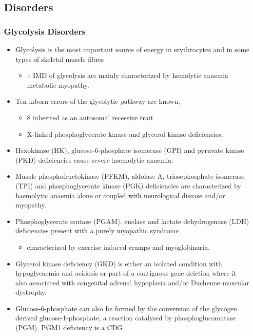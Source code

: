 \documentclass{scrartcl}
\begin{document}
\subsection{Disorders}
\label{sec:orga656f18}
\subsubsection{Glycolysis Disorders}
\label{sec:org9103292}
\begin{itemize}
\item Glycolysis is the most important source of energy in erythrocytes
and in some types of skeletal muscle fibres

\begin{itemize}
\item \(\therefore\) IMD of glycolysis are mainly characterized by hemolytic
anaemia \textpm{} metabolic myopathy.
\end{itemize}

\item Ten inborn errors of the glycolytic pathway are known,
\begin{itemize}
\item 8 inherited as an autosomal recessive trait
\item X-linked phosphoglycerate kinase and glycerol kinase deficiencies.
\end{itemize}

\item Hexokinase (HK), glucose-6-phosphate isomerase (GPI) and pyruvate
kinase (PKD) deficiencies cause severe haemolytic anaemia.

\item Muscle phosphofructokinase (PFKM), aldolase A, triosephosphate
isomerase (TPI) and phosphoglycerate kinase (PGK) deficiencies are
characterized by haemolytic anaemia alone or coupled with
neurological disease and/or myopathy.

\item Phosphoglycerate mutase (PGAM), enolase and lactate dehydrogenase
(LDH) deficiencies present with a purely myopathic syndrome
\begin{itemize}
\item characterized by exercise induced cramps and myoglobinuria.
\end{itemize}

\item Glycerol kinase deficiency (GKD) is either an isolated condition
with hypoglycaemia and acidosis or part of a contiguous
gene deletion where it also associated with congenital adrenal
hypoplasia and/or Duchenne muscular dystrophy.

\item Glucose-6-phosphate can also be formed by the conversion of the
glycogen derived glucose-1-phosphate, a reaction catalysed by
phosphoglucomutase (PGM). PGM1 deficiency is a CDG
\end{itemize}
\end{document}
